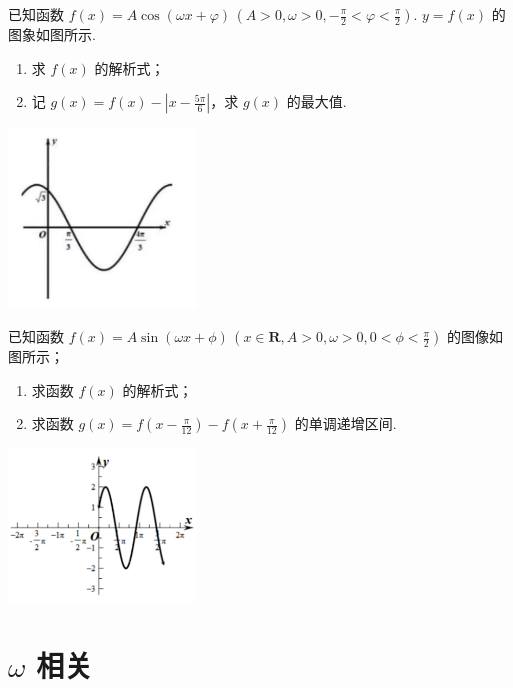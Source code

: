 \documentclass[a4paper , final]{ctexart}
\newenvironment{problemwithfig}[3][2cm]{%
  \item #2
  \par\noindent
  \begin{minipage}[t][8cm][b]{\linewidth}
    \vfill
    \hfill #3
    \par\vspace{#1} %
  \end{minipage}
}{}
\begin{document}
\begin{problems}
\begin{problemwithfig}[5cm]
  {
    已知函数 $f(x) = A\cos(\omega x + \varphi)\,(A > 0, \omega > 0, -\frac{\pi}{2} < \varphi < \frac{\pi}{2})$. $y = f(x)$ 的图象如图所示.
    \begin{enumerate}[label=(\arabic*)]
      \item 求 $f(x)$ 的解析式；
      \item 记 $g(x) = f(x) - \left|x - \frac{5\pi}{6}\right|$，求 $g(x)$ 的最大值.
    \end{enumerate}
  }
  {
    \includegraphics[width=5cm]{Snipaste_2025-07-22_23-32-36.png}
  }
\end{problemwithfig}

\begin{problemwithfig}[5cm]
  {
    已知函数 $f(x) = A\sin(\omega x + \phi)\,(x \in \mathbf{R}, A > 0, \omega > 0, 0 < \phi < \frac{\pi}{2})$ 的图像如图所示；
    \begin{enumerate}[label=(\arabic*)]
      \item 求函数 $f(x)$ 的解析式；
      \item 求函数 $g(x) = f\left(x - \frac{\pi}{12}\right) - f\left(x + \frac{\pi}{12}\right)$ 的单调递增区间.
    \end{enumerate}
  }
  {
    \includegraphics[width=5cm]{Snipaste_2025-07-22_23-35-46.png}
  }
\end{problemwithfig}

\end{problems}


\newpage
\section*{$\omega$ 相关}
\end{document}
